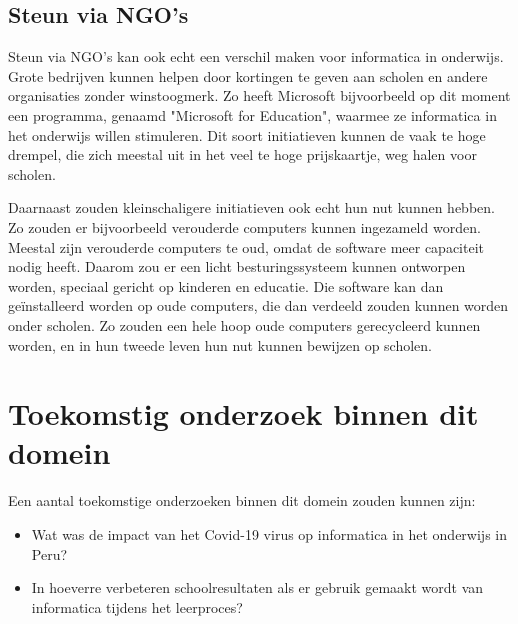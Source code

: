 \subsection{Steun via NGO's}
Steun via NGO's kan ook echt een verschil maken voor informatica in onderwijs. Grote bedrijven kunnen helpen door kortingen te geven aan scholen en andere organisaties zonder winstoogmerk. Zo heeft Microsoft bijvoorbeeld op dit moment een programma, genaamd "Microsoft for Education", waarmee ze informatica in het onderwijs willen stimuleren. Dit soort initiatieven kunnen de vaak te hoge drempel, die zich meestal uit in het veel te hoge prijskaartje, weg halen voor scholen. 

Daarnaast zouden kleinschaligere initiatieven ook echt hun nut kunnen hebben. Zo zouden er bijvoorbeeld verouderde computers kunnen ingezameld worden. Meestal zijn verouderde computers te oud, omdat de software meer capaciteit nodig heeft. Daarom zou er een licht besturingssysteem kunnen ontworpen worden, speciaal gericht op kinderen en educatie. Die software kan dan geïnstalleerd worden op oude computers, die dan verdeeld zouden kunnen worden onder scholen. Zo zouden een hele hoop oude computers gerecycleerd kunnen worden, en in hun tweede leven hun nut kunnen bewijzen op scholen.

\section{Toekomstig onderzoek binnen dit domein}

Een aantal toekomstige onderzoeken binnen dit domein zouden kunnen zijn: 
\begin{itemize}
	\item Wat was de impact van het Covid-19 virus op informatica in het onderwijs in Peru?
	\item In hoeverre verbeteren schoolresultaten als er gebruik gemaakt wordt van informatica tijdens het leerproces?
\end{itemize}

